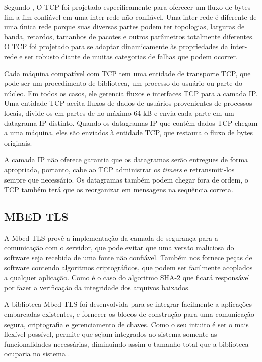 Segundo , O TCP foi projetado especificamente para oferecer um fluxo de bytes fim a fim confiável em uma inter-rede não-confiável. Uma inter-rede é diferente de uma única rede porque suas diversas partes podem ter topologias, larguras de banda, retardos, tamanhos de pacotes e outros parâmetros totalmente diferentes. O TCP foi projetado para se adaptar dinamicamente às propriedades da inter-rede e ser robusto diante de muitas categorias de falhas que podem ocorrer.

Cada máquina compatível com TCP tem uma entidade de transporte TCP, que pode ser um procedimento de biblioteca, um processo do usuário ou parte do núcleo. Em todos os casos, ele gerencia fluxos e interfaces TCP para a camada IP. Uma entidade TCP aceita fluxos de dados de usuários provenientes de processos locais, divide-os em partes de no máximo 64 kB e envia cada parte em um datagrama IP distinto. Quando os datagramas IP que contém dados TCP chegam a uma máquina, eles são enviados à entidade TCP, que restaura o fluxo de bytes originais.

A camada IP não oferece garantia que os datagramas serão entregues de forma apropriada, portanto, cabe ao TCP administrar os \textit{timers} e retransmiti-los sempre que necessário. Os datagramas também podem chegar fora de ordem, o TCP também terá que os reorganizar em mensagens na sequência correta.



\subsection{MBED TLS}
A Mbed TLS provê a implementação da camada de segurança para a comunicação com o servidor, que pode evitar que uma versão maliciosa do software seja recebida de uma fonte não confiável. Também nos fornece peças de software contendo algoritmos criptográficos, que podem ser facilmente acoplados a qualquer aplicação. Como é o caso do algoritmo SHA-2 que ficará responsável por fazer a verificação da integridade dos arquivos baixados.

A biblioteca Mbed TLS foi desenvolvida para se integrar facilmente a aplicações embarcadas existentes, e fornecer os blocos de construção para uma comunicação segura, criptografia e gerenciamento de chaves. Como o seu intuito é ser o mais flexível possível, permite que sejam integrados ao sistema somente as funcionalidades necessárias, diminuindo assim o tamanho total que a biblioteca ocuparia no sistema \cite{mbedtls}.


